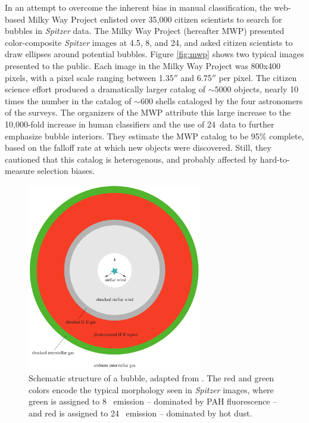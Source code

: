 In an attempt to overcome the inherent bias in manual classification, the web-based Milky Way Project \cite{Simpson12} enlisted over 35,000 citizen scientists to search for bubbles in \emph{Spitzer} data. The Milky Way Project (hereafter MWP) presented color-composite \emph{Spitzer} images at 4.5\um,  8\um, and 24\um, and asked citizen scientists to draw ellipses around potential bubbles. Figure \ref{fig:mwp} shows two typical images presented to the public. Each image in the Milky Way Project was 800x400 pixels, with a pixel scale ranging between 1.35$''$ and 6.75$''$ per pixel. The citizen science effort produced a dramatically larger catalog of $\sim 5000$ objects, nearly 10 times the number in the catalog of $\sim 600$ shells cataloged by the four astronomers of the \cite{Churchwell06, Churchwell07} surveys. The organizers of the MWP attribute this large increase to the 10,000-fold increase in human classifiers and the use of 24\um\, data to further emphasize bubble interiors. They estimate the MWP catalog to be 95\% complete, based on the falloff rate at which new objects were discovered. Still, they cautioned that this catalog is heterogenous, and probably affected by hard-to-measure selection biases.

\begin{figure}[h!]
\includegraphics[width=3in]{schematic}
\caption{Schematic structure of a bubble, adapted from \citep{Freyer03}. The red and green colors encode the typical morphology seen in \emph{Spitzer} images, where green is assigned to 8 \um\, emission -- dominated by PAH fluorescence -- and red is assigned to 24 \um\, emission -- dominated by hot dust.}
\label{fig:schematic}
\end{figure}

